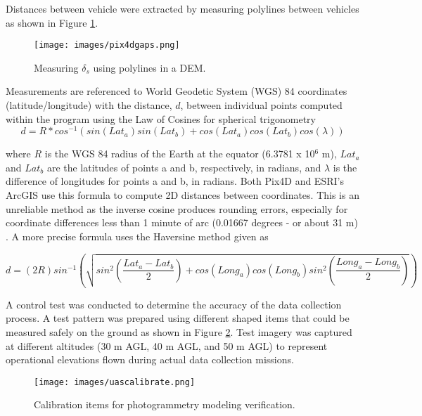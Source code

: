 \documentclass[preprint,12pt,a4paper]{elsarticle}
\begin{document}
\begin{linenumbers}
Distances between vehicle were extracted by measuring polylines between vehicles as shown in Figure \ref{fig:pix4Dgaps}.
%
\begin{figure}[H]
\centering
\texttt{[image: images/pix4dgaps.png]} 
\caption{Measuring $\delta_{s}$ using polylines in a DEM.}
\label{fig:pix4Dgaps}
\end{figure}
%
Measurements are referenced to World Geodetic System (WGS) 84 coordinates (latitude/longitude) with the distance, $d$, between individual points computed within the program using the Law of Cosines for spherical trigonometry \citep{Sinnott1984}
%
\begin{equation}
\label{eq:distTrig}
d = R * cos^{-1}(sin(Lat_{a})sin(Lat_{b}) + cos(Lat_{a})cos(Lat_{b})cos(\lambda))
\end{equation}

\noindent
where $R$ is the WGS 84 radius of the Earth at the equator (6.3781 x 10$^6$ m), $Lat_{a}$ and $Lat_{b}$ are the latitudes of points a and b, respectively, in radians, and $\lambda$ is the difference of longitudes for points a and b, in radians.  Both Pix4D and ESRI's ArcGIS use this formula to compute 2D distances between coordinates. This is an unreliable method as the inverse cosine produces rounding errors, especially for coordinate differences less than 1 minute of arc (0.01667 degrees - or about 31 m) \citep{Sinnott1984}. A more precise formula uses the Haversine method given as 

\begin{equation}
\label{eq:distHaversine}
d = (2R)sin^{-1}\left (\sqrt{ sin^{2}\left ( \frac{Lat_{a}-Lat_{b}}{2} \right ) + cos(Long_{a})cos(Long_{b})sin^{2} \left ( \frac{Long_{a}-Long_{b}}{2} \right ) } \right )
\end{equation}

A control test was conducted to determine the accuracy of the data collection process. A test pattern was prepared using different shaped items that could be measured safely on the ground as shown in Figure \ref{fig:uascalibration}. Test imagery was captured at different altitudes (30 m AGL, 40 m AGL, and 50 m AGL) to represent operational elevations flown during actual data collection missions.

\begin{figure}[H]
\centering
\texttt{[image: images/uascalibrate.png]} 
\caption{Calibration items for photogrammetry modeling verification.}
\label{fig:uascalibration}
\end{figure}


\end{linenumbers}
\end{document}
